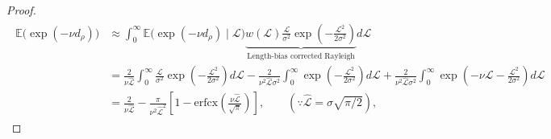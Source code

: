 \documentclass[11pt, class=article, crop=false]{standalone}
\theoremstyle{definition}
\begin{document}
\begin{proof}
    \begin{align}
        \begin{split}
            \mathbb{E}\bigl(\exp({-\nu d_{\rho}}) \bigr)
            &\approx
            \int_0^{\infty} 
                \mathbb{E}\bigl(\exp({-\nu d_{\rho}}) \mid \mathcal{L} \bigr) 
                \underbrace{
                w(\mathcal{L}) \frac{\mathcal{L}}{\sigma^2} \exp(-\frac{\mathcal{L}^2}{2 \sigma^2})
                }_{\text{Length-bias corrected Rayleigh}}
            d \mathcal{L}\\
            &= 
            \frac{2}{\nu \hat{\mathcal{L}}}
            \int_0^{\infty} 
                \frac{\mathcal{L}}{\sigma^2}
                \exp(-\frac{\mathcal{L}^2}{2 \sigma^2})
            d \mathcal{L} 
            -
            \frac{2}{\nu^2 \hat{\mathcal{L}} \sigma^2}
            \int_0^{\infty} 
                \exp(-\frac{\mathcal{L}^2}{2 \sigma^2})
            d \mathcal{L}
            +
            \frac{2}{\nu^2 \hat{\mathcal{L}} \sigma^2}
            \int_0^{\infty} 
                \exp(-\nu \mathcal{L} -\frac{\mathcal{L}^2}{2 \sigma^2})
            d \mathcal{L}
            \\
            &=
            \frac{2}{\nu \hat{\mathcal{L}}} 
            - 
            \frac{\pi}{\nu^2 \hat{\mathcal{L}}^2} 
            \left[
                1 
                - 
                \mathrm{erfcx}
                \left(
                \frac{\nu \hat{\mathcal{L}}}{\sqrt{\pi}}
                \right)
            \right],
            \qquad (\because \hat{\mathcal{L}} = \sigma \sqrt{\pi/2}),
        \end{split}
    \end{align}
    

\end{proof}
\end{document}
